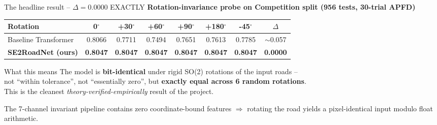 \documentclass[aspectratio=169,10pt]{beamer}
\begin{document}
\begin{frame}{The headline result -- $\Delta = 0.0000$ EXACTLY}
\centering
\textbf{Rotation-invariance probe on Competition split (956 tests, 30-trial APFD)}\\[0.5em]

\scriptsize
\begin{tabular}{l c c c c c c c}
  \toprule
  \textbf{Rotation}  & 0$^\circ$ & +30$^\circ$ & +60$^\circ$ & +90$^\circ$ & +180$^\circ$ & -45$^\circ$ & \textbf{$\Delta$} \\
  \midrule
  Baseline Transformer & 0.8066 & 0.7711 & 0.7494 & 0.7651 & 0.7613 & 0.7785 & \textcolor{alert}{$\sim$0.057} \\
  \rowcolor{success!15}
  \textbf{SE2RoadNet (ours)} & \textbf{0.8047} & \textbf{0.8047} & \textbf{0.8047} & \textbf{0.8047} & \textbf{0.8047} & \textbf{0.8047} & \cellcolor{success!25}\textbf{0.0000} \\
  \bottomrule
\end{tabular}

\vspace{0.8em}
\begin{exampleblock}{What this means}
\footnotesize
The model is \textbf{bit-identical} under rigid SO(2) rotations of the input roads --\\
not ``within tolerance'', not ``essentially zero'', but \textbf{exactly equal across 6 random rotations}.\\[3pt]
This is the cleanest \emph{theory-verified-empirically} result of the project.
\end{exampleblock}

\centering\scriptsize
The 7-channel invariant pipeline contains zero coordinate-bound features $\Rightarrow$
rotating the road yields a pixel-identical input modulo float arithmetic.
\end{frame}
\end{document}
